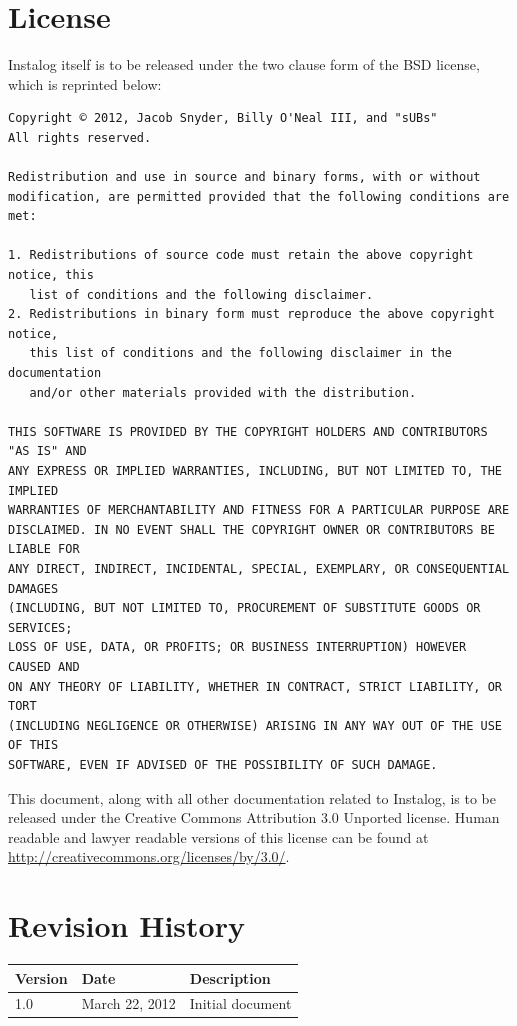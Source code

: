 \documentclass[letterpaper,12pt]{article}
\begin{document}
\newpage


\appendix
\section{License} \label{license}
Instalog itself is to be released under the two clause form of the BSD license,
which is reprinted below:

\begin{verbatim}
Copyright © 2012, Jacob Snyder, Billy O'Neal III, and "sUBs"
All rights reserved.

Redistribution and use in source and binary forms, with or without
modification, are permitted provided that the following conditions are met: 

1. Redistributions of source code must retain the above copyright notice, this
   list of conditions and the following disclaimer. 
2. Redistributions in binary form must reproduce the above copyright notice,
   this list of conditions and the following disclaimer in the documentation
   and/or other materials provided with the distribution. 

THIS SOFTWARE IS PROVIDED BY THE COPYRIGHT HOLDERS AND CONTRIBUTORS "AS IS" AND
ANY EXPRESS OR IMPLIED WARRANTIES, INCLUDING, BUT NOT LIMITED TO, THE IMPLIED
WARRANTIES OF MERCHANTABILITY AND FITNESS FOR A PARTICULAR PURPOSE ARE
DISCLAIMED. IN NO EVENT SHALL THE COPYRIGHT OWNER OR CONTRIBUTORS BE LIABLE FOR
ANY DIRECT, INDIRECT, INCIDENTAL, SPECIAL, EXEMPLARY, OR CONSEQUENTIAL DAMAGES
(INCLUDING, BUT NOT LIMITED TO, PROCUREMENT OF SUBSTITUTE GOODS OR SERVICES;
LOSS OF USE, DATA, OR PROFITS; OR BUSINESS INTERRUPTION) HOWEVER CAUSED AND
ON ANY THEORY OF LIABILITY, WHETHER IN CONTRACT, STRICT LIABILITY, OR TORT
(INCLUDING NEGLIGENCE OR OTHERWISE) ARISING IN ANY WAY OUT OF THE USE OF THIS
SOFTWARE, EVEN IF ADVISED OF THE POSSIBILITY OF SUCH DAMAGE.
\end{verbatim}

This document, along with all other documentation related to Instalog,  is to be
released under the Creative Commons Attribution 3.0 Unported license. Human
readable and lawyer readable versions of this license can be found at
\url{http://creativecommons.org/licenses/by/3.0/}.

\newpage

\section{Revision History} \label{revision_history}
\begin{tabular}{| l | l | l |}
\hline
\textbf{Version} & \textbf{Date} & \textbf{Description} \\
\hline
1.0 & March 22, 2012 & Initial document \\
\hline
\end{tabular}
\end{document}
